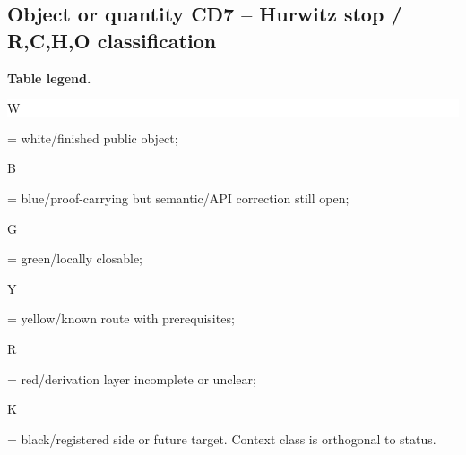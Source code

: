 \subsection*{Object or quantity CD7 -- Hurwitz stop /\allowbreak{} R,C,H,O classification}
\hypertarget{objproof:CD7}{}
\par\smallskip\noindent\begin{minipage}{0.99\linewidth}\footnotesize\raggedright\textbf{Table legend.} \colorbox{white}{\strut W} = white/finished public object; \colorbox{cyan!20}{\strut B} = blue/proof-carrying but semantic/API correction still open; \colorbox{green!18}{\strut G} = green/locally closable; \colorbox{yellow!25}{\strut Y} = yellow/known route with prerequisites; \colorbox{red!20}{\strut R} = red/derivation layer incomplete or unclear; \colorbox{black!18}{\strut K} = black/registered side or future target. Context class is orthogonal to status.\end{minipage}\par\vspace{0.25em}
